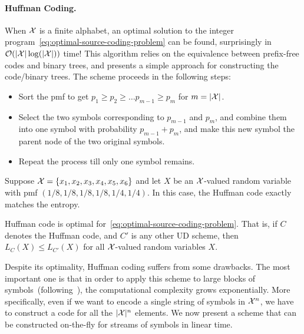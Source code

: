     
    \paragraph{Huffman Coding.} When $\mathcal{X}$ is a finite alphabet, an optimal solution to the integer program~\eqref{eq:optimal-source-coding-problem} can be found, surprisingly in $\mathcal{O}(|\mathcal{X}| \log (|\mathcal{X}|))$ time! This algorithm relies on the equivalence between prefix-free codes and binary trees, and presents a simple approach for constructing the code/binary trees. The scheme proceeds in the following steps: 
    \begin{itemize}
        \item Sort the pmf to get $p_1 \geq p_2 \geq \ldots p_{m-1} \geq p_m$ for $m = |\mathcal{X}|$. 
        \item Select the two symbols corresponding to $p_{m-1}$ and $p_m$, and combine them into one symbol with probability $p_{m-1} + p_{m}$, and make this new symbol the parent node of the two original symbols. 
        \item Repeat the process till only one symbol remains. 
    \end{itemize}

    \begin{example}
        Suppose $\mathcal{X} = \{x_1, x_2, x_3, x_4, x_5, x_6\}$ and let $X$ be an $\mathcal{X}$-valued random variable with pmf $(1/8, 1/8, 1/8, 1/8, 1/4, 1/4)$. In this case, the Huffman code exactly matches the entropy. 
    \end{example}

    \begin{theorem}
        \label{thm:huffman-optimal} Huffman code is optimal for~\eqref{eq:optimal-source-coding-problem}. That is, if $C$ denotes the Huffman code, and $C'$ is any other UD scheme, then $L_C(X) \leq L_{C'}(X)$ for all $\mathcal{X}$-valued random variables $X$. 
    \end{theorem}

    Despite its optimality, Huffman coding suffers from some drawbacks. The most important one is that in order to apply this scheme to large blocks of symbols~(following~), the computational complexity grows exponentially. More specifically, even if we want to encode a single string of symbols in $\mathcal{X}^n$, we have to construct a code for all the $|\mathcal{X}|^n$ elements. We now present a scheme that can be constructed on-the-fly for streams of symbols in linear time. 
    
